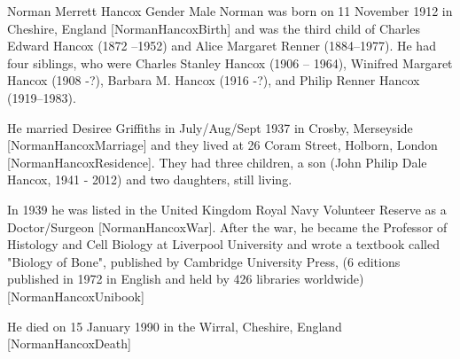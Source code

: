  	Norman Merrett Hancox
Gender 	Male
Norman was born on 11 November 1912 in Cheshire, England [NormanHancoxBirth] and was the third child of  Charles Edward Hancox (1872 --1952) and Alice Margaret Renner (1884--1977).  He had four siblings, who were Charles Stanley Hancox (1906 -- 1964), Winifred Margaret Hancox (1908 -?), Barbara M. Hancox (1916 -?), and Philip Renner Hancox (1919--1983).

He married Desiree Griffiths in July/Aug/Sept 1937 in Crosby, Merseyside [NormanHancoxMarriage] and they lived at 26 Coram Street, Holborn, London [NormanHancoxResidence]. They had three children,  a son (John Philip Dale Hancox, 1941 - 2012) and two daughters, still living.

In 1939 he was listed in the United Kingdom Royal Navy Volunteer Reserve as a  Doctor/Surgeon [NormanHancoxWar].  After the war, he became the Professor of Histology and Cell Biology at Liverpool University and wrote a textbook called "Biology of Bone", published by Cambridge University Press, (6 editions published in 1972 in English and held by 426 libraries worldwide)[NormanHancoxUnibook]

He died on 15 January 1990 in the	Wirral, Cheshire, England [NormanHancoxDeath]


